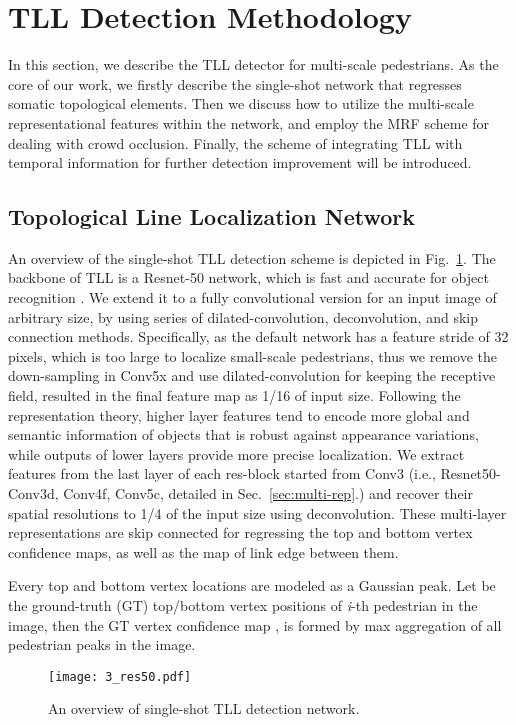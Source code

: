 \documentclass[runningheads]{llncs}
\begin{document}
\section{TLL Detection Methodology}
\label{sec:proposed}

In this section, we describe the TLL detector for multi-scale pedestrians. As the core of our work, we firstly describe the single-shot network that regresses somatic topological elements. Then we discuss how to utilize the multi-scale representational features within the network, and employ the MRF scheme for dealing with crowd occlusion. Finally, the scheme of integrating TLL with temporal information for further detection improvement will be introduced.

\subsection{Topological Line Localization Network}
An overview of the single-shot TLL detection scheme is depicted in Fig.~\ref{fig3}. The backbone of TLL is a Resnet-50 network, which is fast and accurate for object recognition \cite{ResNet}. We extend it to a fully convolutional version for an input image of arbitrary size, by using series of dilated-convolution, deconvolution, and skip connection methods. Specifically, as the default network has a feature stride of 32 pixels, which is too large to localize small-scale pedestrians, thus we remove the down-sampling in Conv5x and use dilated-convolution for keeping the receptive field, resulted in the final feature map as 1/16 of input size. Following the representation theory, higher layer features tend to encode more global and semantic information of objects that is robust against appearance variations, while outputs of lower layers provide more precise localization. We extract features from the last layer of each res-block started from Conv3 (i.e., Resnet50-Conv3d, Conv4f, Conv5c, detailed in Sec.~\ref{sec:multi-rep}.) and recover their spatial resolutions to 1/4 of the input size using deconvolution. These multi-layer representations are skip connected for regressing the top and bottom vertex confidence maps, as well as the map of link edge between them.

Every top and bottom vertex locations are modeled as a Gaussian peak. Let  be the ground-truth (GT) top/bottom vertex positions of {\it i}-th pedestrian in the image, then the GT vertex confidence map , is formed by max aggregation of all  pedestrian peaks in the image.
\begin{figure}[t]
	\centering
	\texttt{[image: 3\_res50.pdf]}
	\caption{An overview of single-shot TLL detection network.}
	\label{fig3}
\end{figure}
\end{document}
